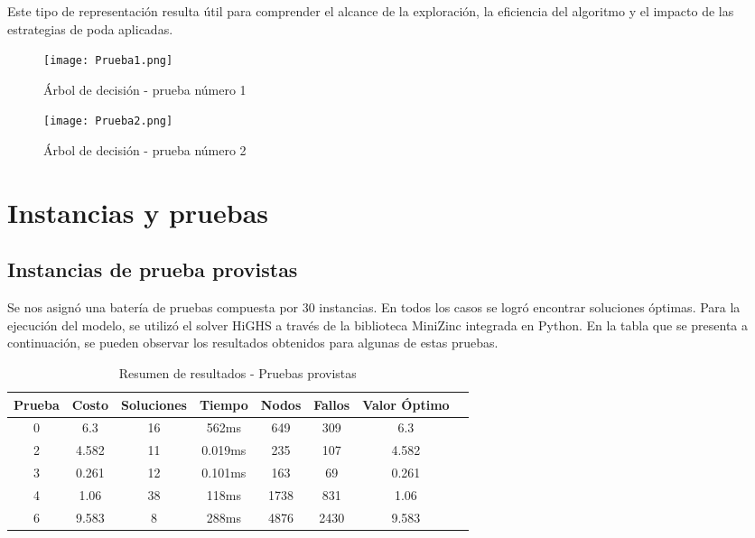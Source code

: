 Este tipo de representación resulta útil para comprender el alcance de la exploración, la eficiencia del algoritmo y el impacto de las estrategias de poda aplicadas.

\vspace{0.7cm}

\begin{figure}[H]
\centering
\texttt{[image: Prueba1.png]}
\caption{Árbol de decisión - prueba número 1}
\end{figure}

\vspace{0.5cm}

\begin{figure}[H]
\centering
\texttt{[image: Prueba2.png]}
\caption{Árbol de decisión - prueba número 2}
\end{figure}

\newpage

\section{Instancias y pruebas}

\subsection{Instancias de prueba provistas}

Se nos asignó una batería de pruebas compuesta por 30 instancias. En todos los casos se logró encontrar soluciones óptimas. Para la ejecución del modelo, se utilizó el solver HiGHS a través de la biblioteca MiniZinc integrada en Python. En la tabla que se presenta a continuación, se pueden observar los resultados obtenidos para algunas de estas pruebas.

\begin{table}[H]
	\centering
	\caption{Resumen de resultados - Pruebas provistas}
	\begin{tabular}{|c|c|c|c|c|c|c|c|}
		\hline
		\rowcolor{gray!30}
		\textbf{Prueba} & \textbf{Costo} & \textbf{Soluciones} & \textbf{Tiempo} & \textbf{Nodos} & \textbf{Fallos} & \textbf{Valor Óptimo} \\
		\hline
		0   &  6.3 & 16   & 562ms  & 649   & 309   & 6.3 \\
		2     & 4.582  &  11 & 0.019ms  &  235 & 107  & 4.582 \\
		3   &  0.261 &  12  & 0.101ms &  163  &   69   & 0.261 \\
		4   & 1.06 & 38  & 118ms  & 1738 & 831  & 1.06 \\
		6  & 9.583 & 8 &  288ms  &  4876 &  2430  & 9.583   \\
		\hline
	\end{tabular}
\end{table}

